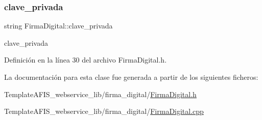\subsubsection{\texorpdfstring{clave\+\_\+privada}{clave\_privada}}
{\footnotesize\ttfamily string Firma\+Digital\+::clave\+\_\+privada}



clave\+\_\+privada 



Definición en la línea 30 del archivo Firma\+Digital.\+h.



La documentación para esta clase fue generada a partir de los siguientes ficheros\+:\begin{DoxyCompactItemize}
\item 
Template\+A\+F\+I\+S\+\_\+webservice\+\_\+lib/firma\+\_\+digital/\hyperlink{FirmaDigital_8h}{Firma\+Digital.\+h}\item 
Template\+A\+F\+I\+S\+\_\+webservice\+\_\+lib/firma\+\_\+digital/\hyperlink{FirmaDigital_8cpp}{Firma\+Digital.\+cpp}\end{DoxyCompactItemize}
